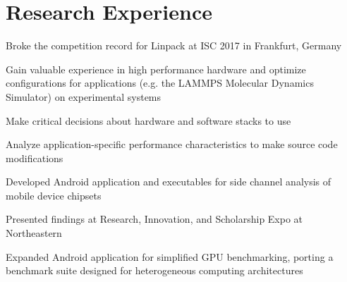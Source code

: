 \documentclass[]{deedy-resume-openfont}
\begin{document}
\vspace{-0.7mm}
\section{\hfill Research Experience \hfill}

\vspace{0.2mm}
\vspace{0.83mm}
\begin{tightemize}
\item Broke the competition record for Linpack at ISC 2017 in Frankfurt, Germany
\item Gain valuable experience in high performance hardware and optimize configurations for applications (e.g. the LAMMPS Molecular Dynamics Simulator) on experimental systems
\item Make critical decisions about hardware and software stacks to use
\item Analyze application-specific performance characteristics to make source code modifications
\end{tightemize}

\vspace{2mm}
\vspace{0.1mm}
\vspace{1.3mm}
\begin{tightemize}
\item Developed Android application and executables for side channel analysis of mobile device chipsets
\item Presented findings at Research, Innovation, and Scholarship Expo at Northeastern
\item Expanded Android application for simplified GPU benchmarking, porting a benchmark suite designed for heterogeneous computing architectures
\end{tightemize}

\vspace{-1mm}
\end{document}
